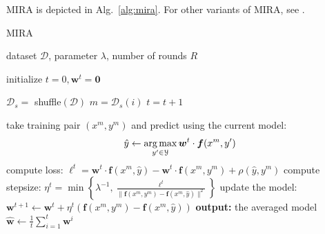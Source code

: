 MIRA is depicted in Alg.~\ref{alg:mira}. For other variants of MIRA, see \citet{Crammer2006}.  


\begin{algorithm}[t]

   \caption{MIRA \label{alg:mira}}

\begin{algorithmic}[1]
    dataset $\mathcal{D}$, parameter $\lambda$, number of rounds $R$

   \STATE initialize $t = 0, \boldsymbol{w}^t = \mathbf{0}$

         \STATE $\mathcal{D}_s =$ shuffle$(\mathcal{D})$
        \STATE $m = \mathcal{D}_s(i)$
        \STATE $t = t+1$

	\STATE take training pair $(x^m, y^m)$ and predict using the current model: 
	$$\hat{y}  \leftarrow \operatorname*{arg\,max}_{y'\in\mathcal{Y}} \boldsymbol{w}^t \cdot \boldsymbol{f}(x^m,y')$$
	\STATE compute loss: $\ell^t = \boldsymbol{w}^t \cdot \boldsymbol{f}(x^m,\hat{y}) - \boldsymbol{w}^t \cdot \boldsymbol{f}(x^m,y^m) + \rho(\hat{y},y^m)$
	\STATE compute stepsize: $\eta^t = \min\left\{\lambda^{-1}, \frac{\ell^t}{\|\boldsymbol{f}(x^m,y^m) - \boldsymbol{f}(x^m,\hat{y})\|^2}\right\}$
	\STATE update the model: 
	$\boldsymbol{w}^{t+1} \leftarrow  \boldsymbol{w}^{t} + \eta^t  (\boldsymbol{f}(x^m,y^m) - \boldsymbol{f}(x^m,\hat{y}))$
	\ENDFOR
	\ENDFOR
   \STATE \textbf{output:} the averaged model $\hat{\boldsymbol{w}} \leftarrow \frac{1}{t}\sum_{i=1}^{t} \boldsymbol{w}^i$

\end{algorithmic}
%
%
%
%
%

\end{algorithm}



